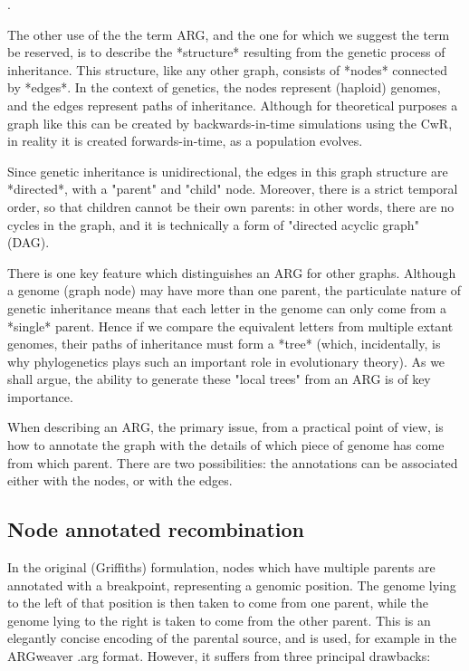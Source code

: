 \documentclass{article}
\begin{document}
\citep[e.g.][]{minichiello2006mapping,mathieson2020ancestry}.


The other use of the the term ARG, and the one for which we suggest the term be
reserved, is to describe the *structure* resulting from the genetic process of
inheritance. This structure, like any other graph, consists of *nodes*
connected by *edges*. In the context of genetics, the nodes represent (haploid)
genomes, and the edges represent paths of inheritance. Although for theoretical
purposes a graph like this can be created by backwards-in-time simulations
using the CwR, in reality it is created forwards-in-time, as a population
evolves.

Since genetic inheritance is unidirectional, the edges in this graph structure
are *directed*, with a "parent" and "child" node. Moreover, there is a strict
temporal order, so that children cannot be their own parents: in other words,
there are no cycles in the graph, and it is technically a form of "directed
acyclic graph" (DAG).


There is one key feature which distinguishes an ARG for other graphs. Although
a genome (graph node) may have more than one parent, the particulate nature of
genetic inheritance means that each letter in the genome can only come from a
*single* parent. Hence if we compare the equivalent letters from multiple
extant genomes, their paths of inheritance must form a *tree* (which,
incidentally, is why phylogenetics plays such an important role in evolutionary
theory). As we shall argue, the ability to generate these "local trees" from an
ARG is of key importance.

When describing an ARG, the primary issue, from a practical point of view, is
how to annotate the graph with the details of which piece of genome has come
from which parent. There are two possibilities: the annotations can be
associated either with the nodes, or with the edges.

\subsection*{Node annotated recombination}

In the original (Griffiths) formulation, nodes which have multiple parents are
annotated with a breakpoint, representing a genomic position. The genome
lying to the left of that position is then taken to come from one parent, while
the genome lying to the right is taken to come from the other parent. This is
an elegantly concise encoding of the parental source, and is used, for example
in the ARGweaver .arg format. However, it suffers from three principal
drawbacks:
\end{document}
